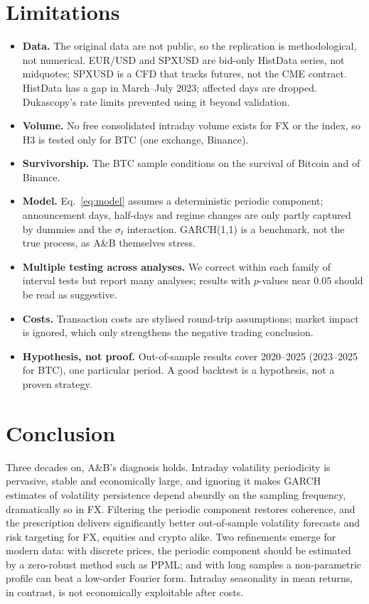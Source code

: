 \documentclass[11pt,a4paper]{article}
\begin{document}
\section{Limitations}
\label{sec:lim}
\begin{itemize}
\item \textbf{Data.} The original data are not public, so the replication is methodological, not numerical. EUR/USD and SPXUSD are bid-only HistData series, not midquotes; SPXUSD is a CFD that tracks futures, not the CME contract. HistData has a gap in March--July 2023; affected days are dropped. Dukascopy's rate limits prevented using it beyond validation.
\item \textbf{Volume.} No free consolidated intraday volume exists for FX or the index, so H3 is tested only for BTC (one exchange, Binance).
\item \textbf{Survivorship.} The BTC sample conditions on the survival of Bitcoin and of Binance.
\item \textbf{Model.} Eq.~\eqref{eq:model} assumes a deterministic periodic component; announcement days, half-days and regime changes are only partly captured by dummies and the $\sigma_t$ interaction. GARCH(1,1) is a benchmark, not the true process, as A\&B themselves stress.
\item \textbf{Multiple testing across analyses.} We correct within each family of interval tests but report many analyses; results with $p$-values near 0.05 should be read as suggestive.
\item \textbf{Costs.} Transaction costs are stylised round-trip assumptions; market impact is ignored, which only strengthens the negative trading conclusion.
\item \textbf{Hypothesis, not proof.} Out-of-sample results cover 2020--2025 (2023--2025 for BTC), one particular period. A good backtest is a hypothesis, not a proven strategy.
\end{itemize}

\section{Conclusion}
\label{sec:concl}
Three decades on, A\&B's diagnosis holds. Intraday volatility periodicity is pervasive, stable and economically large, and ignoring it makes GARCH estimates of volatility persistence depend absurdly on the sampling frequency, dramatically so in FX. Filtering the periodic component restores coherence, and the prescription delivers significantly better out-of-sample volatility forecasts and risk targeting for FX, equities and crypto alike. Two refinements emerge for modern data: with discrete prices, the periodic component should be estimated by a zero-robust method such as PPML; and with long samples a non-parametric profile can beat a low-order Fourier form. Intraday seasonality in mean returns, in contrast, is not economically exploitable after costs.
\end{document}
